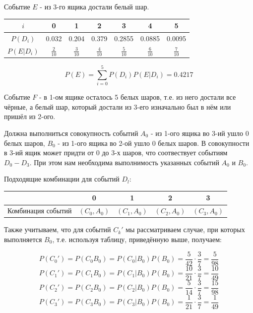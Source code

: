 Событие $E$ - из 3-го ящика достали белый шар.

\begin{table}[h]
	\centering\makegapedcells
	\begin{tabular}{|c|c|c|c|c|c|c|}
		\hline
		$i$        & 0              & 1              & 2              & 3              & 4              & 5              \\ \hline
		$P(D_i)$   & 0.032          & 0.204          & 0.379          & 0.2855         & 0.0885         & 0.0095         \\ \hline
		$P(E|D_i)$ & $\frac{2}{10}$ & $\frac{3}{10}$ & $\frac{4}{10}$ & $\frac{5}{10}$ & $\frac{6}{10}$ & $\frac{7}{10}$ \\ \hline
	\end{tabular}
\end{table}

\[ P(E) = \sum_{i=0}^{5} P(D_i)P(E|D_i) = 0.4217 \]

Событие $F$ - в 1-ом ящике осталось 5 белых шаров, т.е. из него достали все чёрные, а белый шар, который достали из 3-его изначально был в нём или пришёл из 2-ого.

Должна выполниться совокупность событий $A_0$ - из 1-ого ящика во 3-ий ушло 0 белых шаров, $B_0$ - из 1-ого ящика во 2-ой ушло 0 белых шаров. В совокупности в 3-ий ящик может придти от 0 до 3-х шаров, что соотвествует событиям $D_0-D_3$. При этом нам необходима выполнимость указанных событий $A_0$ и $B_0$.

Подходящие комбинации для событий $D_l$:

\begin{table}[h]
	\centering\makegapedcells
	\begin{tabular}{|c|c|c|c|c|}
		\hline
		& 0            & 1            & 2            & 3            \\ \hline
		Комбинация событий & $(C_0, A_0)$ & $(C_1, A_0)$ & $(C_2, A_0)$ & $(C_3, A_0)$ \\ \hline
	\end{tabular}
\end{table}

Также учитываем, что для событий $C_k'$ мы рассматриваем случае, при которых выполняется $B_0$, т.е. используя таблицу, приведённую выше, получаем:

\[ P(C_0') = P(C_0B_0) = P(C_0|B_0)P(B_0) = \dfrac{5}{42} \cdot \dfrac{3}{7} = \dfrac{5}{98} \]
\[ P(C_1') = P(C_1B_0) = P(C_1|B_0)P(B_0) = \dfrac{10}{21} \cdot \dfrac{3}{7} = \dfrac{10}{49} \]
\[ P(C_2') = P(C_2B_0) = P(C_2|B_0)P(B_0) = \dfrac{5}{14} \cdot \dfrac{3}{7} = \dfrac{15}{98} \]
\[ P(C_3') = P(C_3B_0) = P(C_3|B_0)P(B_0) = \dfrac{1}{21} \cdot \dfrac{3}{7} = \dfrac{1}{49} \]

